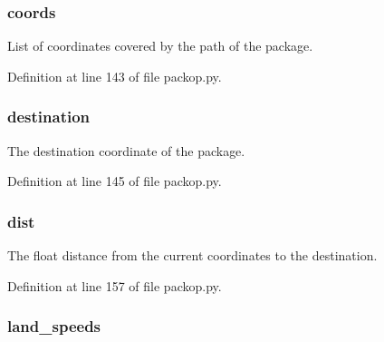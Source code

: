 \subsubsection[{\texorpdfstring{coords}{coords}}]{\setlength{\rightskip}{0pt plus 5cm}coords}\hypertarget{classsrc_1_1packop_1_1_package_adf44f03c6ae7b279f60019d07e59891c}{}\label{classsrc_1_1packop_1_1_package_adf44f03c6ae7b279f60019d07e59891c}


List of coordinates covered by the path of the package. 



Definition at line 143 of file packop.\+py.

\subsubsection[{\texorpdfstring{destination}{destination}}]{\setlength{\rightskip}{0pt plus 5cm}destination}\hypertarget{classsrc_1_1packop_1_1_package_a78018be0196ca47c5ce84ad62a0d4dba}{}\label{classsrc_1_1packop_1_1_package_a78018be0196ca47c5ce84ad62a0d4dba}


The destination coordinate of the package. 



Definition at line 145 of file packop.\+py.

\subsubsection[{\texorpdfstring{dist}{dist}}]{\setlength{\rightskip}{0pt plus 5cm}dist}\hypertarget{classsrc_1_1packop_1_1_package_a93606e6aea9563f73484a536c9c5636d}{}\label{classsrc_1_1packop_1_1_package_a93606e6aea9563f73484a536c9c5636d}


The float distance from the current coordinates to the destination. 



Definition at line 157 of file packop.\+py.

\subsubsection[{\texorpdfstring{land\+\_\+speeds}{land_speeds}}]{\setlength{\rightskip}{0pt plus 5cm}land\+\_\+speeds}\hypertarget{classsrc_1_1packop_1_1_package_a6de40c006b5febc83838475246a10f13}{}\label{classsrc_1_1packop_1_1_package_a6de40c006b5febc83838475246a10f13}


